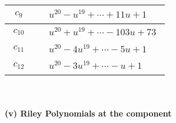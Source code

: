 \documentclass[1p]{elsarticle_modified}
\theoremstyle{definition}
\begin{document}
\begin{tabular}{m{50pt}|m{274pt}}
\hline $$\begin{aligned}c_{9}\end{aligned}$$&$\begin{aligned}
&u^{20}- u^{19}+\cdots+11 u+1
\end{aligned}$\\
\hline $$\begin{aligned}c_{10}\end{aligned}$$&$\begin{aligned}
&u^{20}+u^{19}+\cdots-103 u+73
\end{aligned}$\\
\hline $$\begin{aligned}c_{11}\end{aligned}$$&$\begin{aligned}
&u^{20}-4 u^{19}+\cdots-5 u+1
\end{aligned}$\\
\hline $$\begin{aligned}c_{12}\end{aligned}$$&$\begin{aligned}
&u^{20}-3 u^{19}+\cdots- u+1
\end{aligned}$\\
\hline
\end{tabular}\\~\\
\newpage\renewcommand{\arraystretch}{1}
\flushleft \textbf{(v) Riley Polynomials at the component}\newline \\
\end{document}

